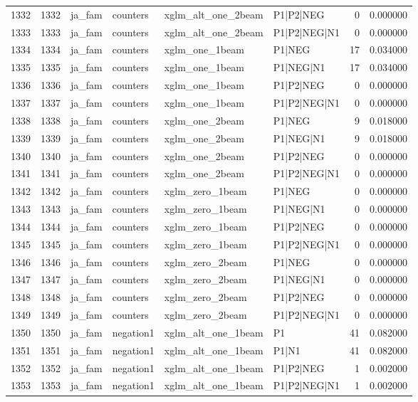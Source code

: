\begin{tabular}{lrllllrr}
1332 & 1332 & ja_fam & counters & xglm_alt_one_2beam & P1|P2|NEG & 0 & 0.000000 \\
1333 & 1333 & ja_fam & counters & xglm_alt_one_2beam & P1|P2|NEG|N1 & 0 & 0.000000 \\
1334 & 1334 & ja_fam & counters & xglm_one_1beam & P1|NEG & 17 & 0.034000 \\
1335 & 1335 & ja_fam & counters & xglm_one_1beam & P1|NEG|N1 & 17 & 0.034000 \\
1336 & 1336 & ja_fam & counters & xglm_one_1beam & P1|P2|NEG & 0 & 0.000000 \\
1337 & 1337 & ja_fam & counters & xglm_one_1beam & P1|P2|NEG|N1 & 0 & 0.000000 \\
1338 & 1338 & ja_fam & counters & xglm_one_2beam & P1|NEG & 9 & 0.018000 \\
1339 & 1339 & ja_fam & counters & xglm_one_2beam & P1|NEG|N1 & 9 & 0.018000 \\
1340 & 1340 & ja_fam & counters & xglm_one_2beam & P1|P2|NEG & 0 & 0.000000 \\
1341 & 1341 & ja_fam & counters & xglm_one_2beam & P1|P2|NEG|N1 & 0 & 0.000000 \\
1342 & 1342 & ja_fam & counters & xglm_zero_1beam & P1|NEG & 0 & 0.000000 \\
1343 & 1343 & ja_fam & counters & xglm_zero_1beam & P1|NEG|N1 & 0 & 0.000000 \\
1344 & 1344 & ja_fam & counters & xglm_zero_1beam & P1|P2|NEG & 0 & 0.000000 \\
1345 & 1345 & ja_fam & counters & xglm_zero_1beam & P1|P2|NEG|N1 & 0 & 0.000000 \\
1346 & 1346 & ja_fam & counters & xglm_zero_2beam & P1|NEG & 0 & 0.000000 \\
1347 & 1347 & ja_fam & counters & xglm_zero_2beam & P1|NEG|N1 & 0 & 0.000000 \\
1348 & 1348 & ja_fam & counters & xglm_zero_2beam & P1|P2|NEG & 0 & 0.000000 \\
1349 & 1349 & ja_fam & counters & xglm_zero_2beam & P1|P2|NEG|N1 & 0 & 0.000000 \\
1350 & 1350 & ja_fam & negation1 & xglm_alt_one_1beam & P1 & 41 & 0.082000 \\
1351 & 1351 & ja_fam & negation1 & xglm_alt_one_1beam & P1|N1 & 41 & 0.082000 \\
1352 & 1352 & ja_fam & negation1 & xglm_alt_one_1beam & P1|P2|NEG & 1 & 0.002000 \\
1353 & 1353 & ja_fam & negation1 & xglm_alt_one_1beam & P1|P2|NEG|N1 & 1 & 0.002000 \\

\end{tabular}
